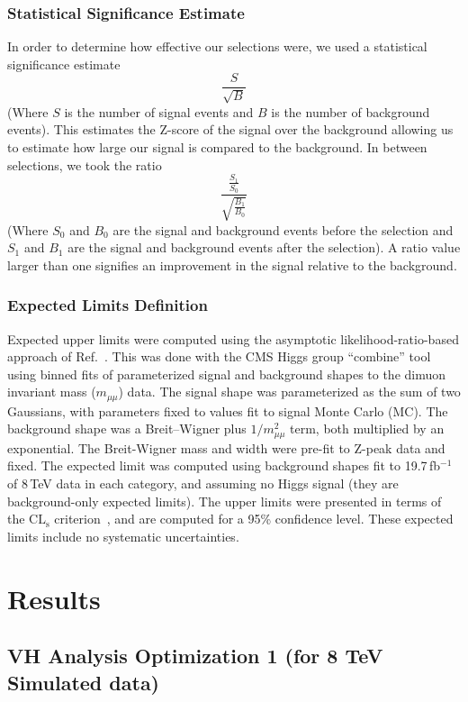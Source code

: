 \documentclass[12pt]{article}
\begin{document}
\subsubsection{Statistical Significance Estimate}

In order to determine how effective our selections were, we used a statistical significance estimate 
	\[\frac{S}{\sqrt{B}} \] 
(Where $S$ is the number of signal events and $B$ is the number of background events). 
This estimates the Z-score of the signal over the background allowing us to estimate how large our signal is compared to the background. 
In between selections, we took the ratio 
	\[\frac{\frac{S_{1}}{S_{0}}}{\sqrt{\frac{B_{1}}{B_{0}}}} \] 
(Where $S_{0}$ and $B_{0}$ are the signal and background events before the selection 
and $S_{1}$ and $B_{1}$ are the signal and background events after the selection). 
A ratio value larger than one signifies an improvement in the signal relative to the background.

\subsubsection{Expected Limits Definition}

Expected upper limits were computed using the asymptotic likelihood-ratio-based approach of 
Ref.~\cite{stats}.  This was done with the CMS Higgs group ``combine'' tool using binned
fits of parameterized signal and background shapes to the dimuon invariant mass 
($m_{\mu\mu}$) data.  The signal shape was parameterized
as the sum of two Gaussians, with parameters fixed to values fit to signal Monte Carlo (MC).
The background shape was a Breit--Wigner plus $1/m_{\mu\mu}^2$ term, both multiplied
by an exponential.  The Breit-Wigner mass and width were pre-fit to Z-peak data and fixed.
The expected limit was computed
using background shapes fit to 19.7\,fb$^{-1}$ of 8\,TeV data in each category,
and assuming no Higgs signal (they are background-only expected limits).  The upper
limits were presented in terms of the $\mathrm{CL_s}$ criterion~\cite{cls}, and are computed for 
a 95\% confidence level.  These expected limits include no systematic uncertainties.

\section{Results}

\subsection{VH Analysis Optimization 1 (for 8 TeV Simulated data)}
\end{document}
